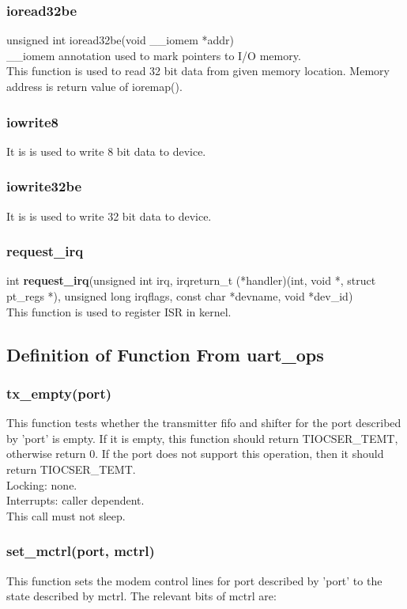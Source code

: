 \documentclass[12pt,a4paper]{article}
\begin{document}
\subsubsection{ioread32be}
unsigned int ioread32be(void \_\_iomem *addr)\\
\_\_iomem annotation used to mark pointers to I/O memory.\\
This function is used to read 32 bit data from given memory location. Memory address is return value of ioremap().
\subsubsection{iowrite8}
It is is used to write 8 bit data to device.
\subsubsection{iowrite32be}
It is is used to write 32 bit data to device.
\subsubsection{request\_irq}
\hypertarget{requestirq}{}
int \textbf{request\_irq}(unsigned int irq,
                irqreturn\_t (*handler)(int, void *, struct pt\_regs *),
                unsigned long irqflags,
                const char *devname,
                void *dev\_id)\\
This function is used to register ISR in kernel.
                      
\subsection{Definition of Function From uart\_ops }
\subsubsection{tx\_empty(port)} This function tests whether the transmitter fifo and shifter
	for the port described by 'port' is empty.  If it is empty,
	this function should return TIOCSER\_TEMT, otherwise return 0.
	If the port does not support this operation, then it should
	return TIOCSER\_TEMT. \\
Locking: none.\\
	Interrupts: caller dependent.\\
	This call must not sleep.\\
\subsubsection{set\_mctrl(port, mctrl)}
	This function sets the modem control lines for port described
	by 'port' to the state described by mctrl.  The relevant bits
	of mctrl are:\\
	
\end{document}
